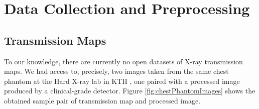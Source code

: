 \documentclass[nomenclature, english, bibtex]{kththesis}
\numberwithin{listing}{chapter}
\begin{document}
\section{Data Collection and Preprocessing}
\label{sec:dataCollection}


\subsection{Transmission Maps}

To our knowledge, there are currently no open datasets of X-ray transmission maps.
We had access to, precisely, two images taken from the same chest phantom at the Hard X-ray lab in KTH ,
one paired with a processed image produced by a clinical-grade detector. Figure \ref{fig:chestPhantomImages} shows the obtained sample
pair of transmission map and processed image.
\end{document}
